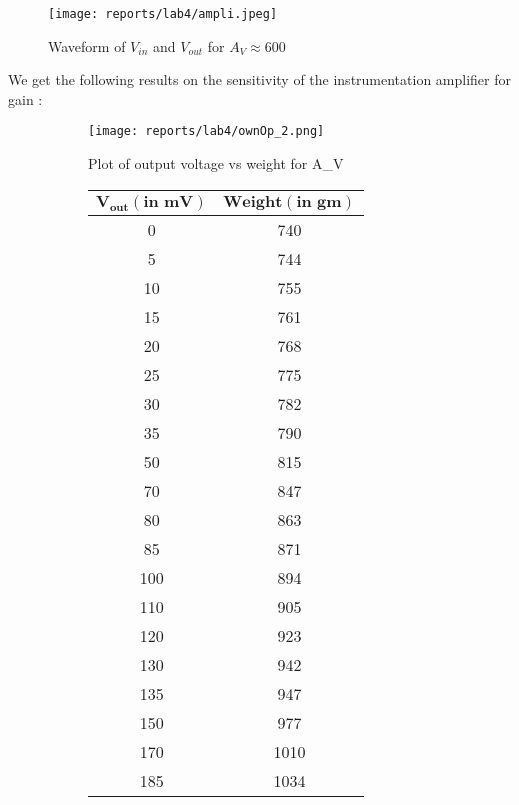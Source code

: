 \documentclass[12pt]{article}
\begin{document}
        \begin{figure}[H]
            \centering
            \texttt{[image: reports/lab4/ampli.jpeg]}
            \caption{Waveform of $V_{in}$ and $V_{out}$ for $A_V \approx 600$}
        \end{figure}
        \noindent
        We get the following results on the sensitivity of the instrumentation amplifier for gain :
        
        \begin{figure}[H]
            \begin{subfigure}{0.7\linewidth}
                \centering
                \texttt{[image: reports/lab4/ownOp\_2.png]}
                \caption{Plot of output voltage vs weight for A_V }
            \end{subfigure} 
            \begin{subfigure}{0.2\linewidth}
                \centering
                \begin{tabular}{|c|c|}
                \hline
                \bfseries $\mathbf{V_{out}(\text{in mV})}$	& \bfseries	$\mathbf{Weight(\text{in gm})}$	\\
                \hline
                    0	&				740 \\
                    5	&				744 \\
                    10	&				755 \\ 
                    15	&				761 \\
                    20	&				768 \\
                    25	&				775 \\ 
                    30	&				782 \\
                    35	&				790 \\
                    50	&				815 \\
                    70	&				847 \\
                    80	&				863 \\
                    85	&				871 \\
                    100	&				894 \\
                    110	&				905 \\
                    120	&				923 \\
                    130	&				942 \\
                    135	&				947 \\
                    150	&				977 \\ 
                    170	&				1010\\
                    185	&				1034\\
                \hline
                \end{tabular}
            \end{subfigure} 
        \end{figure}
\end{document}

